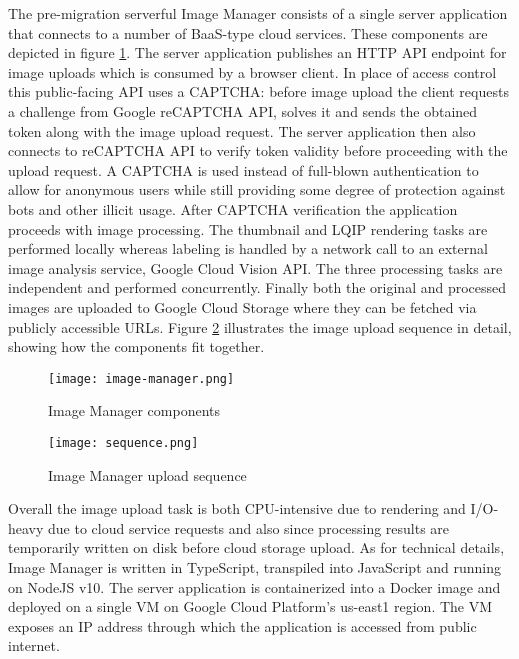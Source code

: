The pre-migration serverful Image Manager consists of a single server application that connects to a number of BaaS-type cloud services. These components are depicted in figure \ref{fig:serverfulArchitecture}. The server application publishes an HTTP API endpoint for image uploads which is consumed by a browser client. In place of access control this public-facing API uses a CAPTCHA: before image upload the client requests a challenge from Google reCAPTCHA API, solves it and sends the obtained token along with the image upload request. The server application then also connects to reCAPTCHA API to verify token validity before proceeding with the upload request. A CAPTCHA is used instead of full-blown authentication to allow for anonymous users while still providing some degree of protection against bots and other illicit usage. After CAPTCHA verification the application proceeds with image processing. The thumbnail and LQIP rendering tasks are performed locally whereas labeling is handled by a network call to an external image analysis service, Google Cloud Vision API. The three processing tasks are independent and performed concurrently. Finally both the original and processed images are uploaded to Google Cloud Storage where they can be fetched via publicly accessible URLs. Figure \ref{fig:serverfulSequence} illustrates the image upload sequence in detail, showing how the components fit together.

\begin{figure}[H]
  \centering
  \texttt{[image: image-manager.png]}
  \caption{Image Manager components}
  \label{fig:serverfulArchitecture}
\end{figure}

\begin{figure}[H]
  \centering
  \texttt{[image: sequence.png]}
  \caption{Image Manager upload sequence}
  \label{fig:serverfulSequence}
\end{figure}

Overall the image upload task is both CPU-intensive due to rendering and I/O-heavy due to cloud service requests and also since processing results are temporarily written on disk before cloud storage upload. As for technical details, Image Manager is written in TypeScript, transpiled into JavaScript and running on NodeJS v10. The server application is containerized into a Docker image and deployed on a single VM on Google Cloud Platform's us-east1 region. The VM exposes an IP address through which the application is accessed from public internet.

